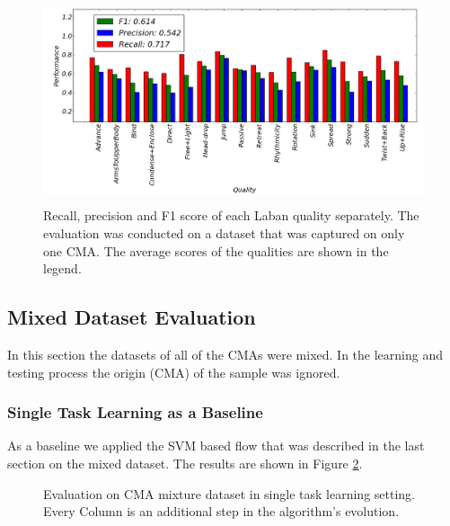\documentclass[11pt,twocolumn,varwidth=true,a4paper,fleqn]{article}
\begin{document}
\begin{figure}
	\centering
	\includegraphics[width=\textwidth, height=60mm]{oneCMAFinalWithoutTitle.png}
	\caption{Recall, precision and F1 score of each Laban quality separately. The
	evaluation was conducted on a dataset that was captured on only one CMA. 
	The average scores of the qualities are shown in the legend.}
	\label{oneCMAFinal}
\end{figure}
	
\subsection{Mixed Dataset Evaluation}
	In this section the datasets of all of the CMAs were mixed. In the learning
	and testing process the origin (CMA) of the sample was ignored. 
\subsubsection{Single Task Learning as a Baseline}
As a baseline we applied the SVM based flow that was described in the last
section on the mixed dataset. The results are shown in Figure \ref{mixedCMASummary}.


\begin{figure}[ht]
\centering
{}
\caption{Evaluation on CMA mixture dataset in single task learning
		setting. Every Column is an additional step in the algorithm's evolution.}
\label{mixedCMASummary}
\end{figure}
\end{document}
